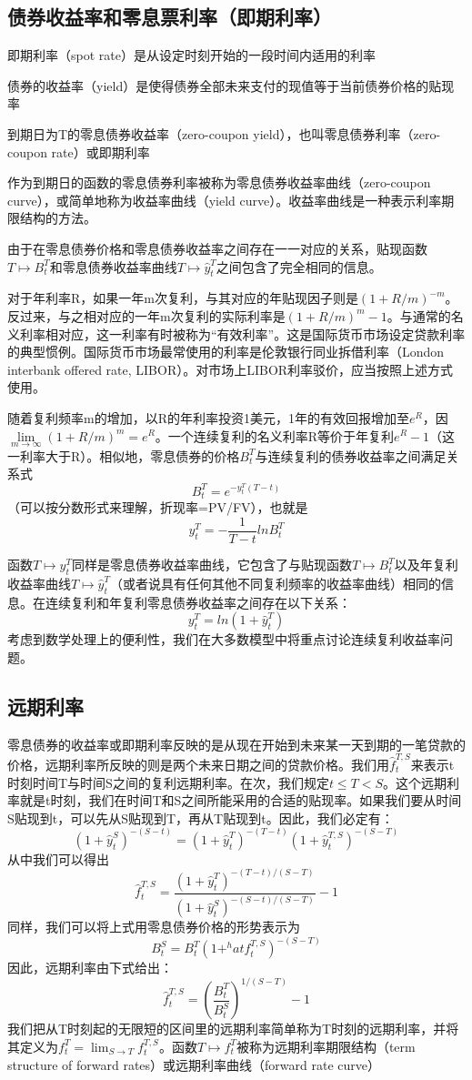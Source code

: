 \documentclass[UTF8]{ctexart}
\begin{document}
\subsection{债券收益率和零息票利率（即期利率）}
即期利率（spot rate）是从设定时刻开始的一段时间内适用的利率

债券的收益率（yield）是使得债券全部未来支付的现值等于当前债券价格的贴现率

到期日为T的零息债券收益率（zero-coupon yield），也叫零息债券利率（zero-coupon rate）或即期利率

作为到期日的函数的零息债券利率被称为零息债券收益率曲线（zero-coupon curve），或简单地称为收益率曲线（yield curve）。收益率曲线是一种表示利率期限结构的方法。

由于在零息债券价格和零息债券收益率之间存在一一对应的关系，贴现函数$T \mapsto B^T_t$和零息债券收益率曲线$T \mapsto \hat y_t^T$之间包含了完全相同的信息。

对于年利率R，如果一年m次复利，与其对应的年贴现因子则是$(1+R/m)^{-m}$。反过来，与之相对应的一年m次复利的实际利率是$(1+R/m)^m-1$。与通常的名义利率相对应，这一利率有时被称为“有效利率”。这是国际货币市场设定贷款利率的典型惯例。国际货币市场最常使用的利率是伦敦银行同业拆借利率（London interbank offered rate, LIBOR）。对市场上LIBOR利率驳价，应当按照上述方式使用。

随着复利频率m的增加，以R的年利率投资1美元，1年的有效回报增加至$e^R$，因$\lim\limits_{m\rightarrow \infty}(1+R/m)^m=e^R$。一个连续复利的名义利率R等价于年复利$e^R-1$（这一利率大于R）。相似地，零息债券的价格$B_t^T$与连续复利的债券收益率之间满足关系式$$B_t^T=e^{-y^T_t(T-t)}$$
（可以按分数形式来理解，折现率=PV/FV），也就是$$y_t^T=-\frac {1} {T-t}ln B_t^T$$

函数$T \mapsto y_t^T$同样是零息债券收益率曲线，它包含了与贴现函数$T \mapsto B_t^T$以及年复利收益率曲线$T \mapsto \hat y_t^T$（或者说具有任何其他不同复利频率的收益率曲线）相同的信息。在连续复利和年复利零息债券收益率之间存在以下关系：$$y_t^T=ln(1+\hat y_t^T)$$考虑到数学处理上的便利性，我们在大多数模型中将重点讨论连续复利收益率问题。

\subsection{远期利率}

零息债券的收益率或即期利率反映的是从现在开始到未来某一天到期的一笔贷款的价格，远期利率所反映的则是两个未来日期之间的贷款价格。我们用$\hat f_t^{T,S}$来表示t时刻时间T与时间S之间的复利远期利率。在次，我们规定$t \leq T < S$。这个远期利率就是t时刻，我们在时间T和S之间所能采用的合适的贴现率。如果我们要从时间S贴现到t，可以先从S贴现到T，再从T贴现到t。因此，我们必定有：$$(1+\hat y_t^S)^{-(S-t)} = (1+\hat y_t^T)^{-(T-t)} (1+\hat y_t^{T,S})^{-(S-T)} $$从中我们可以得出$$\hat f_t^{T,S}=\frac {(1+\hat y_t^T)^{-(T-t)/(S-T)}} {(1+\hat y_t^S)^{-(S-t)/(S-T)}} -1 $$
同样，我们可以将上式用零息债券价格的形势表示为$$B_t^S=B_t^T(1+^hat f_t^{T,S})^{-(S-T)}$$因此，远期利率由下式给出：$$\hat f_t^{T,S}=(\frac{B_t^T}{B_t^S})^{1/(S-T)}-1$$
我们把从T时刻起的无限短的区间里的远期利率简单称为T时刻的远期利率，并将其定义为$f_t^T=\lim_{S \rightarrow T}f_t^{T,S}$。函数$T \mapsto f_t^T$被称为远期利率期限结构（term structure of forward rates）或远期利率曲线（forward rate curve）
\end{document}
